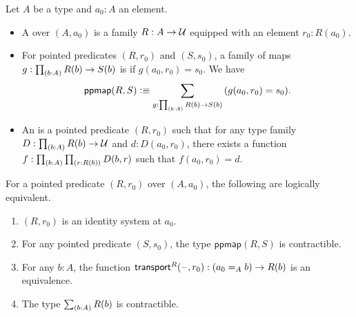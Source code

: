 \documentclass[hott-all.tex]{subfiles}
\begin{document}
% 
% 
% 
% 
% 
% 
\begin{defn}
  Let $A$ be a type and $a_0:A$ an element.
  \begin{itemize}
  \item A 
    over $(A,a_0)$ is a family $R:A\to\mathcal{U}$ equipped with an element $r_0:R(a_0)$.
  \item For pointed predicates $(R,r_0)$ and $(S,s_0)$, a family of maps $g:\prd{b:A} R(b) \to S(b)$ is  if $g(a_0, r_0)=s_0$.
    We have
    \[ \mathsf{ppmap}(R,S) \defeq \sm{g:\prd{b:A} R(b) \to S(b)} (g(a_0, r_0)=s_0).\]
  \item An 
    is a pointed predicate $(R,r_0)$ such that for any type family $D:\prd{b:A} R(b) \to \type$ and $d:D(a_0,r_0)$, there exists a function $f:\prd{b:A}{r:R(b)} D(b,r)$ such that $f(a_0,r_0)=d$.
\end{itemize}
\end{defn}
% 
\begin{thm}
  For a pointed predicate $(R,r_0)$ over $(A,a_0)$, the following are logically equivalent.
  \begin{enumerate}
  \item $(R,r_0)$ is an identity system at $a_0$.
  \item For any pointed predicate $(S,s_0)$, the type $\mathsf{ppmap}(R,S)$ is contractible.
  \item For any $b:A$, the function $\mathsf{transport}^{R}(\mathord{\hspace{1pt}\text{--}\hspace{1pt}},r_0) : (a_0 =_A b) \to R(b)$ is an equivalence.
  \item The type $\sm{b:A} R(b)$ is contractible.
  \end{enumerate}
\end{thm}
\end{document}
